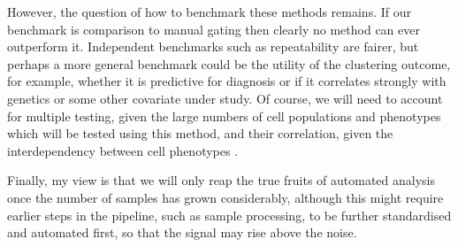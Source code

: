 

However, the question of how to benchmark these methods remains.
If our benchmark is comparison to manual gating then clearly no method can ever outperform it.
Independent benchmarks such as repeatability are fairer, but perhaps a more general benchmark could be the utility of the clustering outcome, for example, whether it is predictive for diagnosis or if it correlates strongly with genetics or some other covariate under study.
Of course, we will need to account for multiple testing, given the large numbers of cell populations and phenotypes which will be tested using this method, and their correlation, given the interdependency between cell phenotypes \citep{Roederer:2015eu}.


Finally, my view is that we will only reap the true fruits of automated analysis once the number of samples has grown considerably, although this might require earlier steps in the pipeline, such as sample processing, to be further standardised and automated first, so that the signal may rise above the noise.




